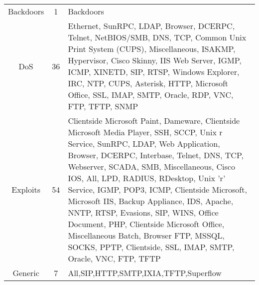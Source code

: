 \begin{table}[htbp]
\begin{tabularx}{\textwidth}{@{}ccX@{}}
		Backdoors                         & 1                                 & Backdoors                                                                                                                                                                                                                                                                                                                                                                                                                                                                                                                                                           \\
		DoS                               & 36                                & Ethernet, SunRPC, LDAP, Browser, DCERPC, Telnet, NetBIOS/SMB, DNS, TCP, Common Unix Print System (CUPS), Miscellaneous, ISAKMP, Hypervisor,
		Cisco Skinny, IIS Web Server, IGMP, ICMP, XINETD, SIP, RTSP, Windows Explorer, IRC, NTP, CUPS, Asterisk, HTTP, Microsoft Office, SSL, IMAP, SMTP, Oracle, RDP, VNC, FTP, TFTP, SNMP                                                                                                                                                                                                                                                                                                                                                                                                                                                         \\
		Exploits                          & 54                                & Clientside Microsoft Paint, Dameware, Clientside Microsoft Media Player, SSH, SCCP, Unix r Service, SunRPC, LDAP, Web Application, Browser, DCERPC, Interbase, Telnet, DNS, TCP, Webserver, SCADA, SMB, Miscellaneous, Cisco IOS, All, LPD, RADIUS, RDesktop, Unix 'r' Service, IGMP, POP3, ICMP, Clientside Microsoft, Microsoft IIS, Backup Appliance, IDS, Apache, NNTP, RTSP, Evasions, SIP, WINS, Office Document, PHP, Clientside Microsoft Office, Miscellaneous Batch, Browser FTP, MSSQL, SOCKS, PPTP, Clientside, SSL, IMAP, SMTP, Oracle, VNC, FTP, TFTP \\
		Generic                           & 7                                 & All,SIP,HTTP,SMTP,IXIA,TFTP,Superflow                                                                                                                                                                                                                                                                                                                                                                                                                                                                                                                               \\

\end{tabularx}
\end{table}
